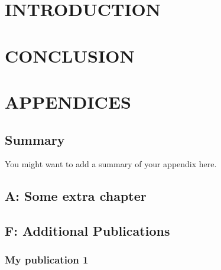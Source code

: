 







\usepackage{pgfplots}
\usepackage{pdfpages} 
\usepackage{adjustbox}
\usepackage{changepage}   
\usepackage{amsmath}
\usepackage{textcomp}
\usepackage{multirow}
\usepackage{xcolor}
\usepackage{hyperref}	
\usepackage{lscape}
\usepackage{array}
\usepackage{enumitem}
\usepackage{ragged2e}





\frontmatter








\tableofcontents
\printnoidxglossaries
\listoffigures
\listoftables


\mainmatter

\part{INTRODUCTION}



\part{CONCLUSION}

		
		
\backmatter
\raggedright


\printbibliography

\justify


\part{APPENDICES}

\iftrue

\chapter{Summary}

You might want to add a summary of your appendix here.

\appendix
{}
\chapter{A: Some extra chapter}





\chapter{F: Additional Publications}


\section{My publication 1}


\fi %


\pagebreak




